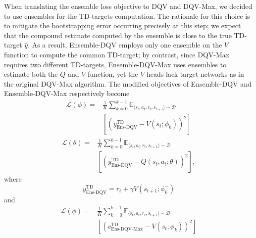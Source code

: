 When translating the ensemble loss objective to DQV and DQV-Max, we
decided to use ensembles for the TD-targets computation. The rationale
for this choice is to mitigate the bootstrapping error occurring
precisely at this step; we expect that the compound estimate computed
by the ensemble is close to the true TD-target $\hat{y}$. As a result,
Ensemble-DQV employs only one ensemble on the $V$ function to compute
the common TD-target; by contrast, since DQV-Max
requires two different TD-targets, Ensemble-DQV-Max uses ensembles to
estimate both the $Q$ and $V$ function, yet the $V$ heads lack target
networks as in the original DQV-Max algorithm. The modified
objectives of Ensemble-DQV and Ensemble-DQV-Max respectively become
\begin{equation}
  \begin{aligned}
    \mathcal{L}\left(\phi\right)=&\frac{1}{K}\sum_{k=0}^{k-1}\mathbb{E}_{\langle
                                   s_t,a_t,r_t,s_{t+1}\rangle\sim\mathcal{D}}\\
                                 &\left[{\left(y^{\scriptscriptstyle\textrm{TD}}_{\scriptscriptstyle\textrm{Ens-DQV}}-V\left(s_t;\phi_{k}\right)\right)}^2\right]
  \end{aligned}
\end{equation}
\begin{equation}
  \begin{aligned}
    \mathcal{L}\left(\theta\right)=&\frac{1}{K}\sum_{k=0}^{k-1}\mathbb{E}_{\langle
                                     s_t,a_t,r_t,s_{t+1}\rangle\sim\mathcal{D}}\\
                                   &\left[{\left(y^{\scriptscriptstyle\textrm{TD}}_{\scriptscriptstyle\textrm{Ens-DQV}}-Q\left(s_t,a_t;\theta\right)\right)}^2\right],
  \end{aligned}
\end{equation}
where
\begin{equation}
  y^{\scriptscriptstyle\textrm{TD}}_{\scriptscriptstyle\textrm{Ens-DQV}}=r_t+\gamma
  V\left(s_{t+1};\phi_{k}^{-}\right)
\end{equation}
and
\begin{equation}
  \begin{aligned}
    \mathcal{L}\left(\phi\right)=&\frac{1}{K}\sum_{k=0}^{k-1}\mathbb{E}_{\langle
                                   s_t,a_t,r_t,s_{t+1}\rangle\sim\mathcal{D}}\\
                                 &\left[{\left(v^{\scriptscriptstyle\textrm{TD}}_{\scriptscriptstyle\textrm{Ens-DQV-Max}}-V\left(s_t;\phi_k\right)\right)}^2\right]
  \end{aligned}
\end{equation}

